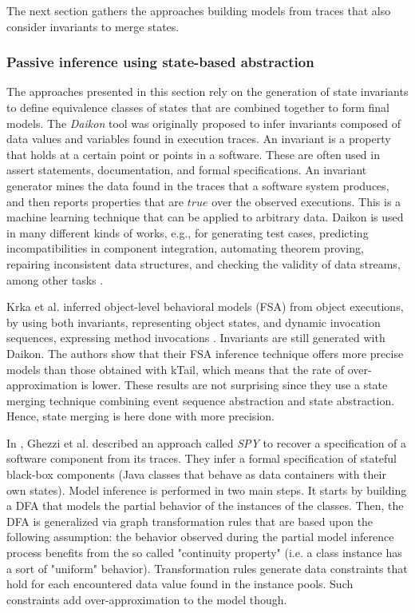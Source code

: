 The next section gathers the approaches building models from
traces that also consider invariants to merge states.

\subsubsection{Passive inference using state-based abstraction}
\label{sec:passive-spec}

The approaches presented in this section rely on the generation
of state invariants to define equivalence classes of states that
are combined together to form final models. The \textit{Daikon}
tool \cite{Ernst:1999:DDL:302405.302467} was originally proposed
to infer invariants composed of data values and variables found
in execution traces. An invariant is a property that holds at a
certain point or points in a software. These are often used in
assert statements, documentation, and formal specifications. An
invariant generator mines the data found in the traces that a
software system produces, and then reports properties that are
$true$ over the observed executions.  This is a machine learning
technique that can be applied to arbitrary data. Daikon is used
in many different kinds of works, e.g., for generating test cases,
predicting incompatibilities in component integration, automating
theorem proving, repairing inconsistent data structures, and
checking the validity of data streams, among other tasks
\cite{Ernst200735}.

Krka et al. inferred object-level behavioral models (FSA) from
object executions, by using both invariants, representing object
states, and dynamic invocation sequences, expressing method
invocations \cite{Krka:2010:UDE:1810295.1810324}.
Invariants are still generated with Daikon. The authors show that
their FSA inference technique offers more precise models than
those obtained with kTail, which means that the rate of
over-approximation is lower. These results are not surprising
since they use a state merging technique combining event sequence
abstraction and state abstraction. Hence, state merging is here
done with more precision.

In \cite{Ghezzi:2009:SIB:1555001.1555057}, Ghezzi et al.
described an approach called \textit{SPY} to recover a
specification of a software component from its traces. They infer
a formal specification of stateful black-box components (Java
classes that behave as data containers with their own states).
Model inference is performed in two main steps. It starts by
building a DFA that models the partial behavior of the instances
of the classes. Then, the DFA is generalized via graph
transformation rules that are based upon the following
assumption: the behavior observed during the partial model
inference process benefits from the so called "continuity
property" (i.e. a class instance has a sort of "uniform"
behavior). Transformation rules generate data constraints that
hold for each encountered data value found in the instance pools.
Such constraints add over-approximation to the model though.


